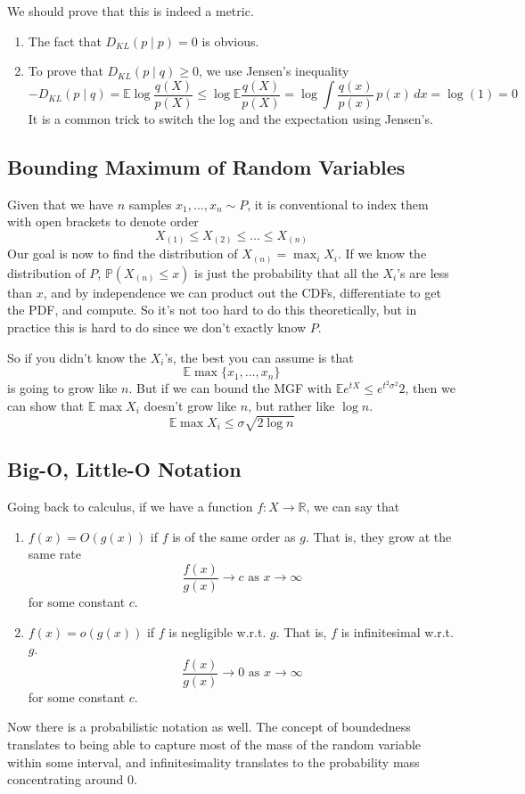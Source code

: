 \documentclass{article}
\begin{document}
    We should prove that this is indeed a metric. 
    \begin{enumerate}
        \item The fact that $D_{KL} (p \mid p) = 0$ is obvious. 
        \item To prove that $D_{KL} (p \mid q) \geq 0$, we use Jensen's inequality
        \[-D_{KL} (p \mid q) = \mathbb{E} \log \frac{q(X)}{p(X)} \leq \log \mathbb{E} \frac{q(X)}{p(X)} = \log \int \frac{q(x)}{p(x)} \, p(x) \, dx = \log(1) = 0\]
        It is a common trick to switch the log and the expectation using Jensen's. 
    \end{enumerate}

    \subsection{Bounding Maximum of Random Variables}

    Given that we have $n$ samples $x_1, \ldots, x_n \sim P$, it is conventional to index them with open brackets to denote order 
    \[X_{(1)} \leq X_{(2)} \leq \ldots \leq X_{(n)}\]
    Our goal is now to find the distribution of $X_{(n)} = \max_i X_i$. If we know the distribution of $P$, $\mathbb{P}(X_{(n)} \leq x)$ is just the probability that all the $X_i$'s are less than $x$, and by independence we can product out the CDFs, differentiate to get the PDF, and compute. So it's not too hard to do this theoretically, but in practice this is hard to do since we don't exactly know $P$. 

    So if you didn't know the $X_i$'s, the best you can assume is that 
    \[\mathbb{E} \max\{x_1, \ldots, x_n\}\]
    is going to grow like $n$. But if we can bound the MGF with $\mathbb{E} e^{t X} \leq e^{t^2 \sigma^2}{2}$, then we can show that $\mathbb{E} \max X_i$ doesn't grow like $n$, but rather like $\log{n}$. 
    \[\mathbb{E} \max{X_i} \leq \sigma \sqrt{2 \log{n}}\]

    \subsection{Big-O, Little-O Notation}

    Going back to calculus, if we have a function $f: X \longrightarrow \mathbb{R}$, we can say that 
    \begin{enumerate}
        \item $f(x) = O(g(x))$ if $f$ is of the same order as $g$. That is, they grow at the same rate 
        \[\frac{f(x)}{g(x)} \rightarrow c \text{ as } x \rightarrow \infty\]
        for some constant $c$. 
        \item $f(x) = o(g(x))$ if $f$ is negligible w.r.t. $g$. That is, $f$ is infinitesimal w.r.t. $g$. 
        \[\frac{f(x)}{g(x)} \rightarrow 0 \text{ as } x \rightarrow \infty\]
        for some constant $c$. 
    \end{enumerate}
    Now there is a probabilistic notation as well. The concept of boundedness translates to being able to capture most of the mass of the random variable within some interval, and infinitesimality translates to the probability mass concentrating around $0$. 
\end{document}
